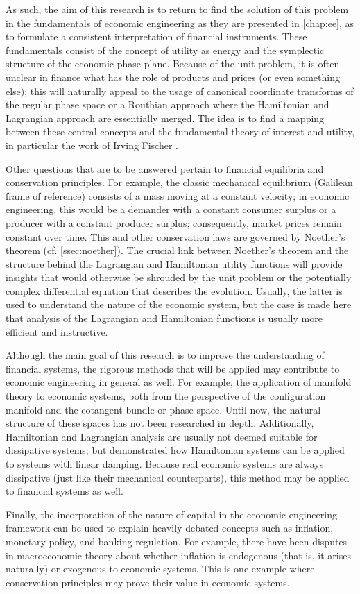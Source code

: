 As such, the aim of this research is to return to find the solution of this problem in the fundamentals of economic engineering as they are presented in \cref{chap:ee}, as to formulate a consistent interpretation of financial instruments. These fundamentals consist of the concept of utility as energy and the symplectic structure of the economic phase plane. Because of the unit problem, it is often unclear in finance what has the role of products and prices (or even something else); this will naturally appeal to the usage of canonical coordinate transforms of the regular phase space or a Routhian approach where the Hamiltonian and Lagrangian approach are essentially merged. The idea is to find a mapping between these central concepts and the fundamental theory of interest and utility, in particular the work of Irving Fischer \cite{Fisher1906,Fisher1930}.

Other questions that are to be answered pertain to financial equilibria and conservation principles. For example, the classic mechanical equilibrium (Galilean frame of reference) consists of a mass moving at a constant velocity; in economic engineering, this would be a demander with a constant consumer surplus or a producer with a constant producer surplus; consequently, market prices remain constant over time. This and other conservation laws are governed by Noether's theorem (cf. \cref{ssec:noether}). The crucial link between Noether's theorem and the structure behind the Lagrangian and Hamiltonian utility functions will provide insights that would otherwise be shrouded by the unit problem or the potentially complex differential equation that describes the evolution. Usually, the latter is used to understand the nature of the economic system, but the case is made here that analysis of the Lagrangian and Hamiltonian functions is usually more efficient and instructive.

Although the main goal of this research is to improve the understanding of financial systems, the rigorous methods that will be applied may contribute to economic engineering in general as well. For example, the application of manifold theory to economic systems, both from the perspective of the configuration manifold and the cotangent bundle or phase space. Until now, the natural structure of these spaces has not been researched in depth. Additionally, Hamiltonian and Lagrangian analysis are usually not deemed suitable for dissipative systems; but \citet{Hutters2020} demonstrated how Hamiltonian systems can be applied to systems with linear damping. Because real economic systems are always dissipative (just like their mechanical counterparts), this method may be applied to financial systems as well.

Finally, the incorporation of the nature of capital in the economic engineering framework can be used to explain heavily debated concepts such as inflation, monetary policy, and banking regulation. For example, there have been disputes in  macroeconomic theory about whether inflation is endogenous (that is, it arises naturally) or exogenous to economic systems. This is one example where conservation principles may prove their value in economic systems.
